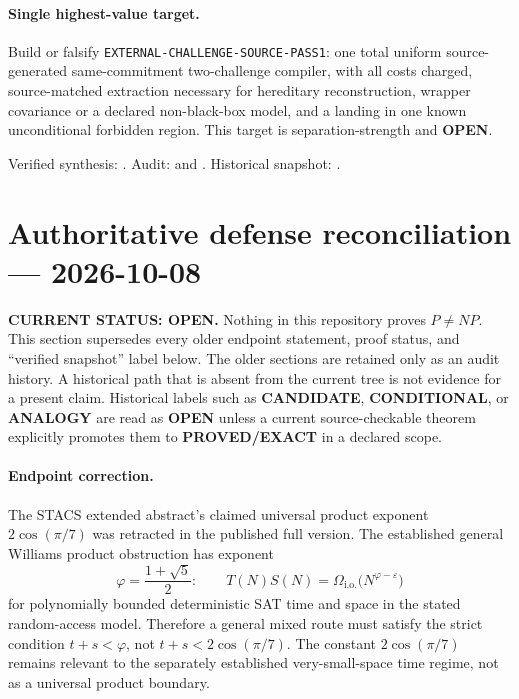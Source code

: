 \documentclass[11pt]{article}
\newcommand{\statusopen}{\textcolor{openstatus}{\textbf{OPEN}}}
\begin{document}
\paragraph{Single highest-value target.}
Build or falsify \texttt{EXTERNAL-CHALLENGE-SOURCE-PASS1}: one total uniform
source-generated same-commitment two-challenge compiler, with all costs
charged, source-matched extraction necessary for hereditary reconstruction,
wrapper covariance or a declared non-black-box model, and a landing in one
known unconditional forbidden region.  This target is separation-strength
and \statusopen.

Verified synthesis:
.
Audit:
 and
.
Historical snapshot:
.

\clearpage


\section{Authoritative defense reconciliation --- 2026-10-08}

\begin{warningbox}
\textbf{CURRENT STATUS: OPEN.}  Nothing in this repository proves
$P\ne NP$.  This section supersedes every older endpoint statement, proof
status, and ``verified snapshot'' label below.  The older sections are retained
only as an audit history.  A historical path that is absent from the current
tree is not evidence for a present claim.  Historical labels such as
\textbf{CANDIDATE}, \textbf{CONDITIONAL}, or \textbf{ANALOGY} are read as
\textbf{OPEN} unless a current source-checkable theorem explicitly promotes
them to \textbf{PROVED/EXACT} in a declared scope.
\end{warningbox}

\paragraph{Endpoint correction.}
The STACS extended abstract's claimed universal product exponent
$2\cos(\pi/7)$ was retracted in the published full version.  The established
general Williams product obstruction has exponent
\[
 \varphi=\frac{1+\sqrt5}{2}:
 \qquad T(N)S(N)=\Omega_{\mathrm{i.o.}}
       \bigl(N^{\varphi-\varepsilon}\bigr)
\]
for polynomially bounded deterministic SAT time and space in the stated
random-access model.  Therefore a general mixed route must satisfy the strict
condition $t+s<\varphi$, not $t+s<2\cos(\pi/7)$.  The constant
$2\cos(\pi/7)$ remains relevant to the separately established very-small-space
time regime, not as a universal product boundary.
\end{document}
